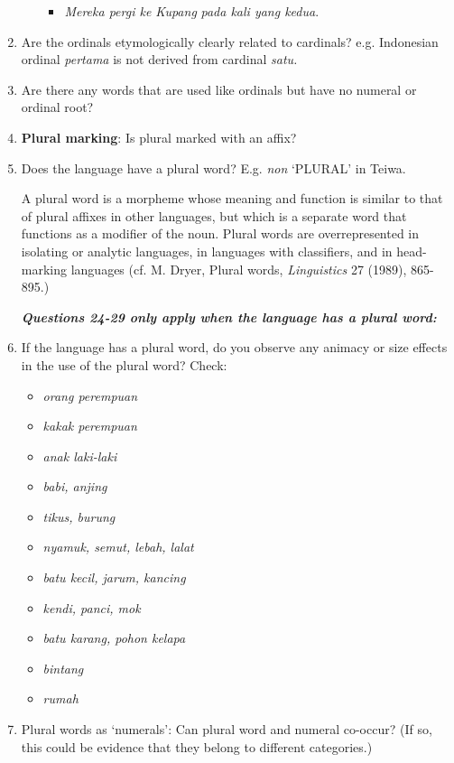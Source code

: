\begin{enumerate}
\begin{itemize}
\begin{itemize}
\item \textit{Mereka pergi ke Kupang} \textit{pada kali yang kedua}.
\end{itemize}
\end{itemize}
\item  Are the ordinals etymologically clearly related to cardinals? e.g. Indonesian ordinal \textit{pertama} is not derived from cardinal \textit{satu.}
\item  Are there any words that are used like ordinals but have no numeral or ordinal root?
\item  \textbf{Plural marking}: Is plural marked with an affix? 
\item  Does the language have a plural word? E.g. \textit{non} `PLURAL' in Teiwa.

A plural word is a morpheme whose meaning and function is similar to that of plural affixes in other languages, but which is a separate word that functions as a modifier of the noun.  Plural words are overrepresented in isolating or analytic languages, in languages with classifiers, and in head-marking languages (cf. M. Dryer, Plural words, \textit{Linguistics} 27 (1989), 865-895.) \nocite{Dryer1989}

\textbf{\textit{Questions 24-29 only apply when the language has a plural word:}}

\item  If the language has a plural word, do you observe any animacy or size effects in the use of the plural word? Check:

\begin{itemize}
\item \textit{orang perempuan} 
\item \textit{kakak perempuan} 
\item \textit{anak laki-laki} 
\item \textit{babi, anjing} 
\item \textit{tikus, burung} 
\item \textit{nyamuk, semut, lebah, lalat} 
\item \textit{batu kecil, jarum, kancing}
\item \textit{kendi, panci, mok}
\item \textit{batu karang, pohon kelapa}
\item \textit{bintang}
\item \textit{rumah}
\end{itemize}
\item  Plural words as `numerals': Can plural word and numeral co-occur? (If so, this could be evidence that they belong to different categories.)


\end{enumerate}
